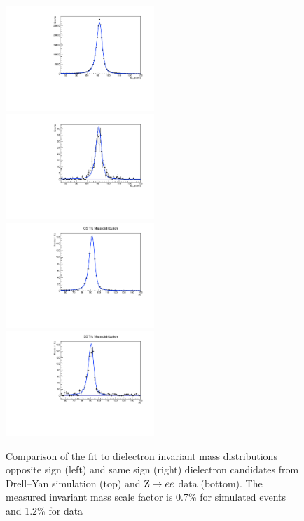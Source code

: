 \begin{figure}
  \includegraphics[width=0.5\textwidth]{4_Analisys/pics/8TeV/fakerate_fits/charge_flip_prob_map_eid12Medium_h2taucutsos_trkMass.pdf}
  \includegraphics[width=0.5\textwidth]{4_Analisys/pics/8TeV//fakerate_fits/charge_flip_prob_map_eid12Medium_h2taucutsss_trkMass.pdf} \\
  \includegraphics[width=0.5\textwidth]{4_Analisys/pics/8TeV/fakerate_fits/charge_flip_prob_map_dataos_trkMass.pdf}
  \includegraphics[width=0.5\textwidth]{4_Analisys/pics/8TeV//fakerate_fits/charge_flip_prob_map_datass_trkMass.pdf} \\  
  \caption{
  Comparison of the fit to dielectron invariant mass distributions opposite sign (left) and same sign (right) dielectron candidates from Drell--Yan simulation (top) and $\mathrm{Z}\rightarrow ee$ data (bottom). The measured invariant mass scale factor is 0.7\% for simulated events and 1.2\% for data}
  \label{fig:ee_invMass_fit}
\end{figure}

